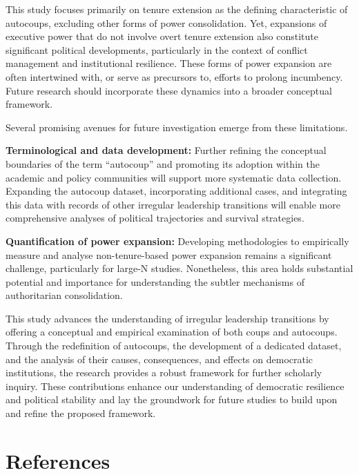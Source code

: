 \documentclass[
  12pt,
]{report}
\begin{document}
This study focuses primarily on tenure extension as the defining
characteristic of autocoups, excluding other forms of power
consolidation. Yet, expansions of executive power that do not involve
overt tenure extension also constitute significant political
developments, particularly in the context of conflict management and
institutional resilience. These forms of power expansion are often
intertwined with, or serve as precursors to, efforts to prolong
incumbency. Future research should incorporate these dynamics into a
broader conceptual framework.

Several promising avenues for future investigation emerge from these
limitations.

\textbf{Terminological and data development:} Further refining the
conceptual boundaries of the term ``autocoup'' and promoting its
adoption within the academic and policy communities will support more
systematic data collection. Expanding the autocoup dataset,
incorporating additional cases, and integrating this data with records
of other irregular leadership transitions will enable more comprehensive
analyses of political trajectories and survival strategies.

\textbf{Quantification of power expansion:} Developing methodologies to
empirically measure and analyse non-tenure-based power expansion remains
a significant challenge, particularly for large-N studies. Nonetheless,
this area holds substantial potential and importance for understanding
the subtler mechanisms of authoritarian consolidation.

This study advances the understanding of irregular leadership
transitions by offering a conceptual and empirical examination of both
coups and autocoups. Through the redefinition of autocoups, the
development of a dedicated dataset, and the analysis of their causes,
consequences, and effects on democratic institutions, the research
provides a robust framework for further scholarly inquiry. These
contributions enhance our understanding of democratic resilience and
political stability and lay the groundwork for future studies to build
upon and refine the proposed framework.

\chapter*{References}\label{references}
\end{document}
